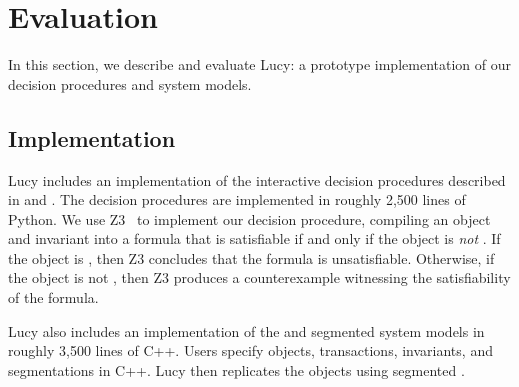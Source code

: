\section{Evaluation}
In this section, we describe and evaluate Lucy: a prototype implementation of
our decision procedures and system models.

\subsection{Implementation}
Lucy includes an implementation of the interactive decision procedures
described in  and
. The decision procedures
are implemented in roughly 2,500 lines of Python.
%
%
We use Z3~\cite{de2008z3} to implement our \invariantclosure{} decision procedure,
compiling an object and invariant into a formula that is satisfiable if and
only if the object is \emph{not} \invariantclosed{}. If the object is
\invariantclosed{}, then Z3 concludes that the formula is unsatisfiable.
Otherwise, if the object is not \invariantclosed{}, then Z3 produces a
counterexample witnessing the satisfiability of the formula.

Lucy also includes an implementation of the \invariantconfluence{} and
segmented \invariantconfluence{} system models in roughly 3,500 lines of C++.
Users specify objects, transactions, invariants, and segmentations in C++. Lucy
then replicates the objects using segmented \invariantconfluence{}.

